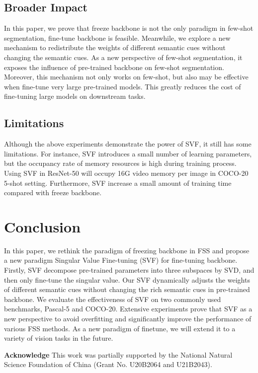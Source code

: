 \documentclass{article}
\begin{document}
\subsection{Broader Impact}
\vspace{-0.5em}
In this paper, we prove that freeze backbone is not the only paradigm in few-shot segmentation, fine-tune backbone is feasible. Meanwhile, we explore a new mechanism to redistribute the weights of different semantic cues without changing the semantic cues. As a new perspective of few-shot segmentation, it exposes the influence of pre-trained backbone on few-shot segmentation. Moreover, this mechanism not only works on few-shot, but also may be effective when fine-tune very large pre-trained models. This greatly reduces the cost of fine-tuning large models on downstream tasks.
\vspace{-0.8em}
\subsection{Limitations}
\vspace{-0.5em}
Although the above experiments demonstrate the power of SVF, it still has some limitations. For instance, SVF introduces a small number of learning parameters, but the occupancy rate of memory resources is high during training process. Using SVF in ResNet-50 will occupy 16G video memory per image in COCO-20 5-shot setting. Furthermore, SVF increase a small amount of training time compared with freeze backbone.


 \section{Conclusion}
\vspace{-.7em}
In this paper, we rethink the paradigm of freezing backbone in FSS and propose a new paradigm Singular Value Fine-tuning (SVF) for fine-tuning backbone. Firstly, SVF decompose pre-trained parameters into three subspaces by SVD, and then only fine-tune the singular value. Our SVF dynamically adjusts the weights of different semantic cues without changing the rich semantic cues in pre-trained backbone. We evaluate the effectiveness of SVF on two commonly used benchmarks, Pascal-5 and COCO-20. Extensive experiments prove that SVF as a new perspective to avoid overfitting and significantly improve the performance of various FSS methods. As a new paradigm of finetune, we will extend it to a variety of vision tasks in the future.

\textbf{Acknowledge} This work was partially supported by the National Natural Science Foundation of China (Grant No. U20B2064 and U21B2043).
 
\end{document}
